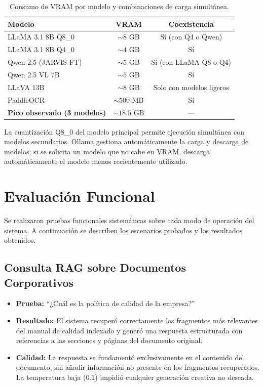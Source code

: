 \begin{table}[H]
\centering
\caption{Consumo de VRAM por modelo y combinaciones de carga simultánea.}
\label{tab:vram-modelos}
\begin{tabular}{lcc}
\toprule
\textbf{Modelo} & \textbf{VRAM} & \textbf{Coexistencia} \\
\midrule
LLaMA 3.1 8B Q8\_0             & $\sim 8$ GB & Sí (con Q4 o Qwen) \\
LLaMA 3.1 8B Q4\_0             & $\sim 4$ GB & Sí \\
Qwen 2.5 (JARVIS FT)           & $\sim 5$ GB & Sí (con LLaMA Q8 o Q4) \\
Qwen 2.5 VL 7B                 & $\sim 5$ GB & Sí \\
LLaVA 13B                      & $\sim 8$ GB & Solo con modelos ligeros \\
PaddleOCR                      & $\sim 500$ MB & Sí \\
\midrule
\textbf{Pico observado (3 modelos)} & $\sim 18.5$ GB & --- \\
\bottomrule
\end{tabular}
\end{table}

La cuantización Q8\_0 del modelo principal permite ejecución simultánea con modelos secundarios. Ollama gestiona automáticamente la carga y descarga de modelos: si se solicita un modelo que no cabe en VRAM, descarga automáticamente el modelo menos recientemente utilizado.

\section{Evaluación Funcional}

Se realizaron pruebas funcionales sistemáticas sobre cada modo de operación del sistema. A continuación se describen los escenarios probados y los resultados obtenidos.

\subsection{Consulta RAG sobre Documentos Corporativos}

\begin{itemize}
    \item \textbf{Prueba:} ``¿Cuál es la política de calidad de la empresa?''
    \item \textbf{Resultado:} El sistema recuperó correctamente los fragmentos más relevantes del manual de calidad indexado y generó una respuesta estructurada con referencias a las secciones y páginas del documento original.
    \item \textbf{Calidad:} La respuesta se fundamentó exclusivamente en el contenido del documento, sin añadir información no presente en los fragmentos recuperados. La temperatura baja ($0.1$) impidió cualquier generación creativa no deseada.
\end{itemize}


